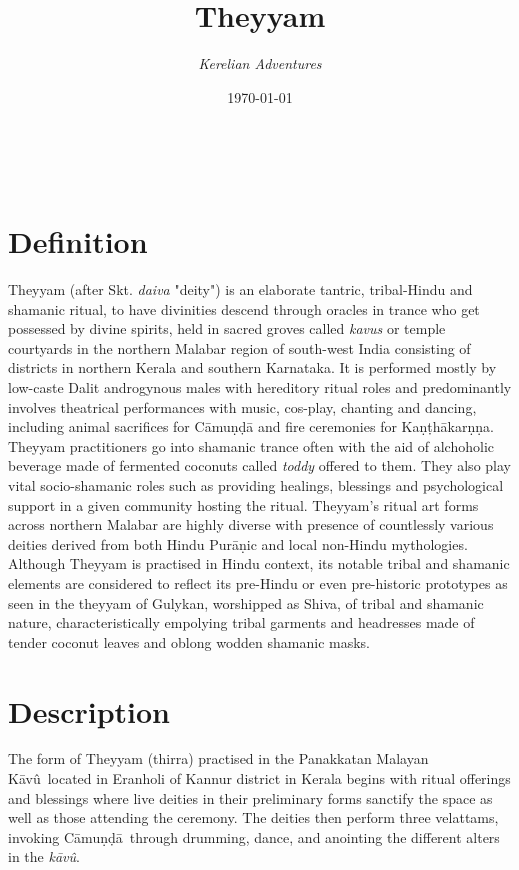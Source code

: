 \documentclass[a4paper, 11pt]{article} %
\title{\textbf{Theyyam}} %
\author{\textit{Kerelian Adventures}} %
\date{\today} %
\makeatletter
\newcommand{\camunda}[0]{C\={a}mu\d{n}\d{d}\={a}}
\newcommand{\kavu}[0]{\textit{k\={a}v\^{u}}}
\newcommand{\Kavu}[0]{K\={a}v\^{u}}
\renewcommand{\maketitle}{ %
\begin{flushright} %
{\LARGE\@title} %

\vspace{10pt} %

{\@author} %
\\\@date %

\vspace{30pt} %
\end{flushright}
}
\makeatother
\begin{document}
\maketitle %

\thispagestyle{empty}


\section{Definition}
  \label{sec:Definition}

Theyyam (after Skt. \textit{daiva} "deity") is an elaborate tantric, tribal-Hindu and shamanic ritual, to have divinities descend through oracles in trance who get possessed by divine spirits, held in sacred groves called \textit{kavus} or temple courtyards in the northern Malabar region of south-west India consisting of districts in northern Kerala and southern Karnataka. It is performed mostly by low-caste Dalit androgynous males with hereditory ritual roles and predominantly involves theatrical performances with music, cos-play, chanting and dancing, including animal sacrifices for C\={a}muṇḍ\={a} and fire ceremonies for Kaṇ\d{t}h\={a}karṇṇa. Theyyam practitioners go into shamanic trance often with the aid of alchoholic beverage made of fermented coconuts called \textit{toddy} offered to them. They also play vital socio-shamanic roles such as providing healings, blessings and psychological support in a given community hosting the ritual. Theyyam's ritual art forms across northern Malabar are highly diverse with presence of countlessly various deities derived from both Hindu Pur\={a}ṇic and local non-Hindu mythologies. Although Theyyam is practised in Hindu context, its notable tribal and shamanic elements are considered to reflect its pre-Hindu or even pre-historic prototypes as seen in the theyyam of Gulykan, worshipped as Shiva, of tribal and shamanic nature, characteristically empolying tribal garments and headresses made of tender coconut leaves and oblong wodden shamanic masks.

\section{Description}%
  \label{sec:Description}
  
The form of Theyyam (thirra) practised in the Panakkatan Malayan \Kavu\ located in Eranholi of Kannur district in Kerala begins with ritual offerings and blessings where live deities in their preliminary forms sanctify the space as well as those attending the ceremony.
The deities then perform three velattams, invoking \camunda\ through drumming, dance, and anointing the different alters in the \kavu.
\end{document}
